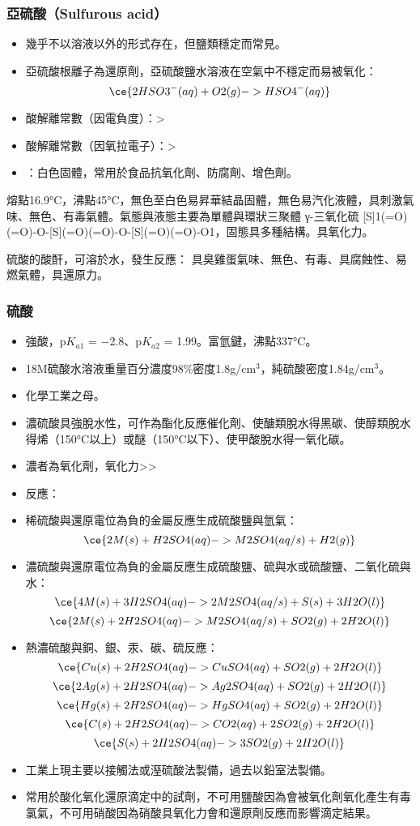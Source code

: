 \documentclass[a4paper,12pt]{report}
\begin{document}
\subsubsection{亞硫酸（Sulfurous acid）}
\begin{itemize}
\item 幾乎不以溶液以外的形式存在，但鹽類穩定而常見。
\item 亞硫酸根離子為還原劑，亞硫酸鹽水溶液在空氣中不穩定而易被氧化：
\[\ce{2HSO3^-(aq) + O2(g) -> HSO4^-(aq)}\]
\item 酸解離常數（因電負度）：>
\item 酸解離常數（因氧拉電子）：>
\item {}：白色固體，常用於食品抗氧化劑、防腐劑、增色劑。
\end{itemize}
\bit
\item 熔點16.9°C，沸點45°C，無色至白色易昇華結晶固體，無色易汽化液體，具刺激氣味、無色、有毒氣體。氣態與液態主要為單體與環狀三聚體 γ-三氧化硫 [S]1(=O)(=O)-O-[S](=O)(=O)-O-[S](=O)(=O)-O1，固態具多種結構。具氧化力。
\item 硫酸的酸酐，可溶於水，發生反應：
\eit
{}
具臭雞蛋氣味、無色、有毒、具腐蝕性、易燃氣體，具還原力。
\subsubsection{硫酸}
\begin{itemize}
\item 強酸，p$K_{a1}$ = −2.8、p$K_{a2}$ = 1.99。富氫鍵，沸點337°C。
\item 18M硫酸水溶液重量百分濃度98\%密度1.8g/cm$^3$，純硫酸密度1.84g/cm$^3$。
\item 化學工業之母。
\item 濃硫酸具強脫水性，可作為酯化反應催化劑、使醣類脫水得黑碳、使醇類脫水得烯（150°C以上）或醚（150°C以下）、使甲酸脫水得一氧化碳。
\item 濃者為氧化劑，氧化力>>
\item 反應：
\bit
\item 稀硫酸與還原電位為負的金屬反應生成硫酸鹽與氫氣：
\[\ce{2M(s) + H2SO4(aq) -> M2SO4(aq/s) + H2(g)}\]
\item 濃硫酸與還原電位為負的金屬反應生成硫酸鹽、硫與水或硫酸鹽、二氧化硫與水：
\[\ce{4M(s) + 3H2SO4(aq) -> 2M2SO4(aq/s) + S(s) + 3H2O(l)}\]
\[\ce{2M(s) + 2H2SO4(aq) -> M2SO4(aq/s) + SO2(g) + 2H2O(l)}\]
\item 熱濃硫酸與銅、銀、汞、碳、硫反應：
\[\ce{Cu(s) + 2H2SO4(aq) -> CuSO4(aq) + SO2(g) + 2H2O(l)}\]
\[\ce{2Ag(s) + 2H2SO4(aq) -> Ag2SO4(aq) + SO2(g) + 2H2O(l)}\]
\[\ce{Hg(s) + 2H2SO4(aq) -> HgSO4(aq) + SO2(g) + 2H2O(l)}\]
\[\ce{C(s) + 2H2SO4(aq) -> CO2(aq) + 2SO2(g) + 2H2O(l)}\]
\[\ce{S(s) + 2H2SO4(aq) -> 3SO2(g) + 2H2O(l)}\]
\eit
\item 工業上現主要以接觸法或溼硫酸法製備，過去以鉛室法製備。
\item 常用於酸化氧化還原滴定中的試劑，不可用鹽酸因為會被氧化劑氧化產生有毒氯氣，不可用硝酸因為硝酸具氧化力會和還原劑反應而影響滴定結果。
\end{itemize}
\end{document}
